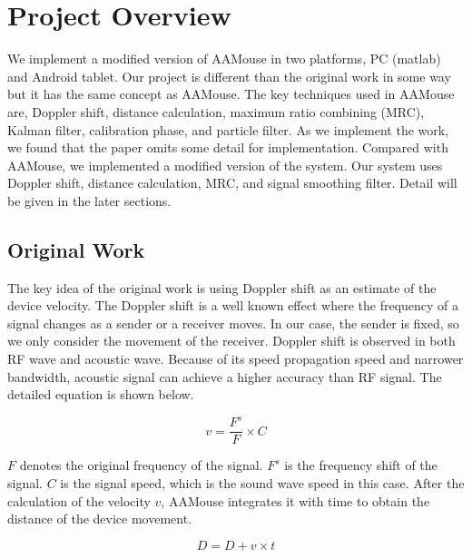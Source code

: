 \documentclass{acm_proc_article-sp}
\begin{document}
\section{Project Overview} \label{project_overview}
We implement a modified version of AAMouse in two platforms, PC
(matlab) and Android tablet. Our project is different than the 
original work in some way but it has the same concept as AAMouse.
The key techniques used in AAMouse are, Doppler shift, distance
calculation,  maximum ratio combining (MRC), Kalman filter,
calibration phase, and particle filter. As we implement the work,
we found that the paper omits some detail for implementation. 
Compared with AAMouse, we implemented a modified version of the 
system. Our system uses Doppler shift, distance calculation, 
MRC, and signal smoothing filter. Detail will be given in the later 
sections. 

\subsection{Original Work}
The key idea of the original work is using Doppler shift as an
estimate of the device velocity. The Doppler shift is a well known
effect where the frequency of a signal changes as a sender or a 
receiver moves. In our case, the sender is fixed, so we only 
consider the movement of the receiver. Doppler shift is observed
in both RF wave and acoustic wave. Because of its speed propagation
speed and narrower bandwidth, 
acoustic signal can achieve a higher accuracy than RF signal.
The detailed equation is shown below.

\begin{equation}
v= \frac {F^s}{F} \times C
\end{equation}

\begin{math} F \end{math} denotes the original frequency of the
signal. \begin{math} F^s \end{math} is the frequency shift of the
signal. \begin{math} C \end{math} is the signal speed, which is the
sound wave speed in this case. After the calculation of the velocity
\begin{math} v \end{math}, AAMouse integrates it 
with time to obtain the distance of the device movement.

\begin{equation}
D = D + v \times t
\end{equation}
\end{document}
